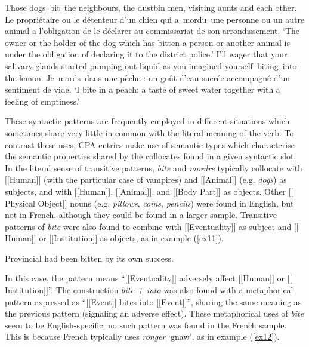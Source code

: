 \documentclass[output=paper]{langsci/langscibook}
\begin{document}
\ea
\label{ex7}
Those dogs~bit~the neighbours, the dustbin men, visiting aunts and
each other.
\ex \label{ex8}
Le propriétaire ou le détenteur d'un chien qui a~mordu~une personne
ou un autre animal a l'obligation de le déclarer au commissariat de son
arrondissement.
\glt `The owner or the holder of the dog which has bitten a
person or another animal is under the obligation of declaring it to the
district police.'
\ex \label{ex9}
I'll wager that your salivary glands started pumping out liquid as
you imagined yourself~biting~into the lemon.
\ex \label{ex10}
Je~mords~dans une pêche : un goût d'eau sucrée accompagné d'un
sentiment de vide.
\glt `I bite in a peach: a taste of sweet water together with a
feeling of emptiness.'
\z





These syntactic patterns are frequently employed in different situations
which sometimes share very little in common with the literal meaning of
the verb. To contrast these uses, CPA entries make use of semantic
types which characterise the semantic properties shared by the
collocates found in a given syntactic slot. In the literal sense of
transitive patterns, \textit{bite} and \textit{mordre} typically collocate with
$[$$[$Human$]$$]$ (with the particular case of vampires) and $[$$[$Animal$]$$]$ (e.g.
\textit{dogs}) as subjects, and with $[$$[$Human$]$$]$, $[$$[$Animal$]$$]$, and $[$$[$Body Part$]$$]$
as objects. Other $[$$[$Physical Object$]$$]$ nouns (e.g. \textit{pillows}, \textit{coins},
\textit{pencils}) were found in English, but not in French, although they
could be found in a larger sample. Transitive patterns of \textit{bite}  were
also found to combine with $[$$[$Eventuality$]$$]$ as subject and $[$$[$Human$]$$]$ or
$[$$[$Institution$]$$]$ as objects, as in example (\ref{ex11}).



\begin{exe}
\ex  \label{ex11} 
Provincial had been bitten by its own success.
\end{exe}





In this case, the pattern means “$[$$[$Eventuality$]$$]$ adversely affect
$[$$[$Human$]$$]$ or $[$$[$Institution$]$$]$”. The construction \textit{bite + into} was also
found with a metaphorical pattern expressed as “$[$$[$Event$]$$]$ bites into
$[$$[$Event$]$$]$”, sharing the same meaning as the previous pattern (signaling
an adverse effect). These metaphorical uses of  \textit{bite} seem to be
English-specific: no such pattern was found in the French sample. This
is because French typically uses \textit{ronger} ‘gnaw’, as in example (\ref{ex12}).
\end{document}
